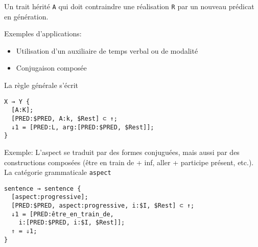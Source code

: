 \documentclass[11pt]{article}
\begin{document}
Un trait hérité \texttt{A} qui doit contraindre une réalisation
\texttt{R} par un nouveau prédicat en génération.

Exemples d'applications:
\begin{itemize}
\item Utilisation d'un auxiliaire de temps verbal ou de modalité
\item Conjugaison composée 
\end{itemize}

La règle générale s'écrit

\begin{lstlisting}
X → Y {
  [A:K];
  [PRED:$PRED, A:k, $Rest] ⊂ ↑;
  ↓1 = [PRED:L, arg:[PRED:$PRED, $Rest]];
}

\end{lstlisting}

Exemple:
L'aspect se traduit par des formes conjuguées, mais aussi par des
constructions composées (\og être en train de + inf\fg{}, \og aller +
participe présent\fg{}, etc.). La catégorie grammaticale \texttt{aspect} 

\begin{lstlisting}
sentence → sentence {
  [aspect:progressive];
  [PRED:$PRED, aspect:progressive, i:$I, $Rest] ⊂ ↑;
  ↓1 = [PRED:être_en_train_de, 
	i:[PRED:$PRED, i:$I, $Rest]];
  ⇑ = ⇓1;
}

\end{lstlisting}
\end{document}
